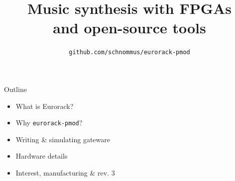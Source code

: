 \documentclass{beamer}
\title{Music synthesis with FPGAs \\and open-source tools}
\subtitle{}
\author{\texttt{github.com/schnommus/eurorack-pmod}}
\institute{Sebastian Holzapfel}
\date{}
\begin{document}
\maketitle

\setwatermark{}









\begin{frame}{Outline}


    \begin{itemize}
        \item What is Eurorack?
        \item Why \texttt{eurorack-pmod}?
        \item Writing \& simulating gateware
        \item Hardware details
        \item Interest, manufacturing \& rev. 3
    \end{itemize}

\end{frame}
\end{document}
